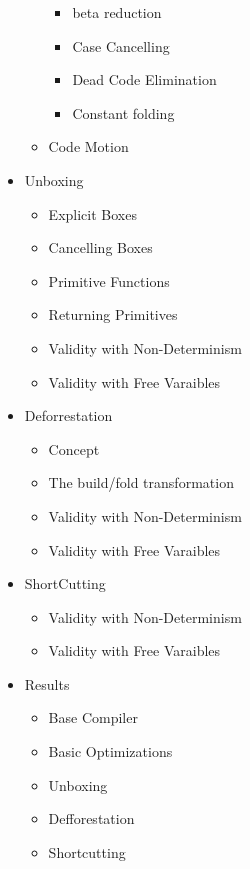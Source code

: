 \documentclass{article}
\begin{document}
\begin{itemize}
\begin{itemize}
        \begin{itemize}
            \item beta reduction
            \item Case Cancelling
            \item Dead Code Elimination
            \item Constant folding
        \end{itemize}
        \item Code Motion
    \end{itemize}
    \item Unboxing
    \begin{itemize}
        \item Explicit Boxes
        \item Cancelling Boxes
        \item Primitive Functions
        \item Returning Primitives
        \item Validity with Non-Determinism
        \item Validity with Free Varaibles
    \end{itemize}
    \item Deforrestation
    \begin{itemize}
        \item Concept
        \item The build/fold transformation
        \item Validity with Non-Determinism
        \item Validity with Free Varaibles
    \end{itemize}
    \item ShortCutting
    \begin{itemize}
        \item Validity with Non-Determinism
        \item Validity with Free Varaibles
    \end{itemize}
    \item Results
    \begin{itemize}
        \item Base Compiler
        \item Basic Optimizations
        \item Unboxing
        \item Defforestation
        \item Shortcutting
    \end{itemize}
\end{itemize}
\end{document}
